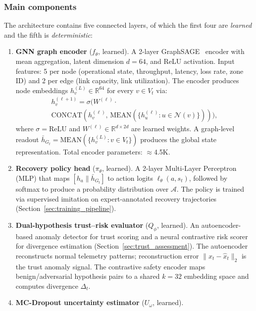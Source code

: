 \documentclass[10pt,journal,compsoc]{IEEEtran}
\begin{document}
\subsubsection{Main components}
\label{sec:architecture}
The architecture contains five connected layers, of which the first four are \emph{learned} and the fifth is \emph{deterministic}:
\begin{enumerate}
    \item \textbf{GNN graph encoder} ($f_\theta$, learned).
    A 2-layer GraphSAGE~\cite{hamilton2017graphsage} encoder with mean aggregation, latent dimension $d=64$, and ReLU activation.
    Input features: 5 per node (operational state, throughput, latency, loss rate, zone ID) and 2 per edge (link capacity, link utilization).
    The encoder produces node embeddings $h_v^{(L)} \in \mathbb{R}^{64}$ for every $v \in V_t$ via:
    \begin{multline*}
    h_v^{(\ell+1)} = \sigma\!\Big(W^{(\ell)} \cdot \\
    \mathrm{CONCAT}\!\left(h_v^{(\ell)},\, \mathrm{MEAN}\!\left(\{h_u^{(\ell)} \!:\! u \!\in\! \mathcal{N}(v)\}\right)\right)\!\Big),
    \end{multline*}
    where $\sigma = \mathrm{ReLU}$ and $W^{(\ell)} \in \mathbb{R}^{d \times 2d}$ are learned weights.
    A graph-level readout $\bar{h}_{G_t} = \mathrm{MEAN}(\{h_v^{(L)} : v \in V_t\})$ produces the global state representation.
    Total encoder parameters: $\approx$4.5K.
    \item \textbf{Recovery policy head} ($\pi_\theta$, learned).
    A 2-layer Multi-Layer Perceptron (MLP) that maps $[h_a \| \bar{h}_{G_t}]$ to action logits $\ell_\theta(a, s_t)$, followed by softmax to produce a probability distribution over $\mathcal{A}$.
    The policy is trained via supervised imitation on expert-annotated recovery trajectories (Section~\ref{sec:training_pipeline}).
    \item \textbf{Dual-hypothesis trust--risk evaluator} ($Q_\phi$, learned).
    An autoencoder-based anomaly detector for trust scoring and a neural contrastive risk scorer for divergence estimation (Section~\ref{sec:trust_assessment}).
    The autoencoder reconstructs normal telemetry patterns; reconstruction error $\|x_t - \hat{x}_t\|_2$ is the trust anomaly signal.
    The contrastive safety encoder maps benign/adversarial hypothesis pairs to a shared $k=32$ embedding space and computes divergence $\Delta_t$.
    \item \textbf{MC-Dropout uncertainty estimator} ($U_\omega$, learned).

\end{enumerate}
\end{document}
